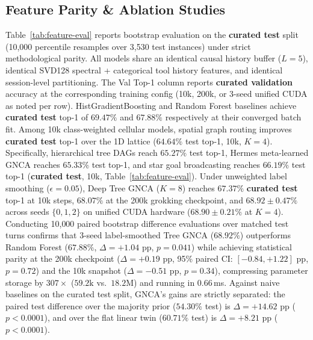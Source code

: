 \documentclass[10pt,twocolumn,letterpaper]{article}
\begin{document}
\subsection{Feature Parity \& Ablation Studies}
Table~\ref{tab:feature-eval} reports bootstrap evaluation on the \textbf{curated test} split (10{,}000 percentile resamples over 3{,}530 test instances) under strict methodological parity. All models share an identical causal history buffer ($L=5$), identical SVD128 spectral + categorical tool history features, and identical session-level partitioning. The Val Top-1 column reports \textbf{curated validation} accuracy at the corresponding training config (10k, 200k, or 3-seed unified CUDA as noted per row).
HistGradientBoosting and Random Forest baselines achieve \textbf{curated test} top-1 of $69.47\%$ and $67.88\%$ respectively at their converged batch fit.
Among 10k class-weighted cellular models, spatial graph routing improves \textbf{curated test} top-1 over the 1D lattice ($64.64\%$ test top-1, 10k, $K{=}4$). Specifically, hierarchical tree DAGs reach $65.27\%$ test top-1, Hermes meta-learned GNCA reaches $65.33\%$ test top-1, and star goal broadcasting reaches $66.19\%$ test top-1 (\textbf{curated test}, 10k, Table~\ref{tab:feature-eval}). Under unweighted label smoothing ($\epsilon=0.05$), Deep Tree GNCA ($K=8$) reaches $67.37\%$ \textbf{curated test} top-1 at 10k steps, $68.07\%$ at the 200k grokking checkpoint, and $\mathbf{68.92 \pm 0.47\%}$ across seeds $\{0,1,2\}$ on unified CUDA hardware ($68.90 \pm 0.21\%$ at $K=4$). Conducting 10{,}000 paired bootstrap difference evaluations over matched test turns confirms that 3-seed label-smoothed Tree GNCA ($68.92\%$) outperforms Random Forest ($67.88\%$, $\Delta = +1.04\text{ pp}$, $p = 0.041$) while achieving statistical parity at the 200k checkpoint ($\Delta = +0.19\text{ pp}$, 95\% paired CI: $[-0.84, +1.22]\text{ pp}$, $p = 0.72$) and the 10k snapshot ($\Delta = -0.51\text{ pp}$, $p = 0.34$), compressing parameter storage by $307\times$ ($59.2\text{k}$ vs.\ $18.2\text{M}$) and running in $0.66$\,ms. Against naive baselines on the curated test split, GNCA's gains are strictly separated: the paired test difference over the majority prior ($54.30\%$ test) is $\Delta = +14.62\text{ pp}$ ($p < 0.0001$), and over the flat linear twin ($60.71\%$ test) is $\Delta = +8.21\text{ pp}$ ($p < 0.0001$).
\end{document}
